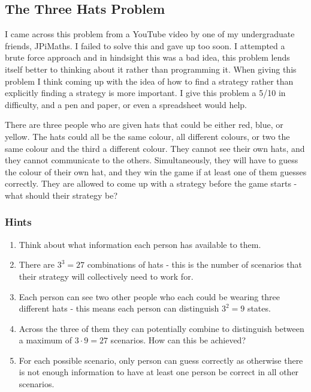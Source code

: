 \subsection{The Three Hats Problem}

I came across this problem from a YouTube video by one of my undergraduate friends, JPiMaths. I failed to solve this and gave up too soon. I attempted a brute force approach and in hindsight this was a bad idea, this problem lends itself better to thinking about it rather than programming it. When giving this problem I think coming up with the idea of how to find a strategy rather than explicitly finding a strategy is more important. I give this problem a 5/10 in difficulty, and a pen and paper, or even a spreadsheet would help.

There are three people who are given hats that could be either red, blue, or yellow. The hats could all be the same colour, all different colours, or two the same colour and the third a different colour. They cannot see their own hats, and they cannot communicate to the others. Simultaneously, they will have to guess the colour of their own hat, and they win the game if at least one of them guesses correctly. They are allowed to come up with a strategy before the game starts - what should their strategy be?

\subsubsection{Hints}

\begin{enumerate}
	\item Think about what information each person has available to them.
	\item There are $3^3 = 27$ combinations of hats - this is the number of scenarios that their strategy will collectively need to work for.
	\item Each person can see two other people who each could be wearing three different hats - this means each person can distinguish $3^2 = 9$ states.
	\item Across the three of them they can potentially combine to distinguish between a maximum of $3 \cdot 9 = 27$ scenarios. How can this be achieved?
	\item For each possible scenario, only person can guess correctly as otherwise there is not enough information to have at least one person be correct in all other scenarios.
\end{enumerate}


